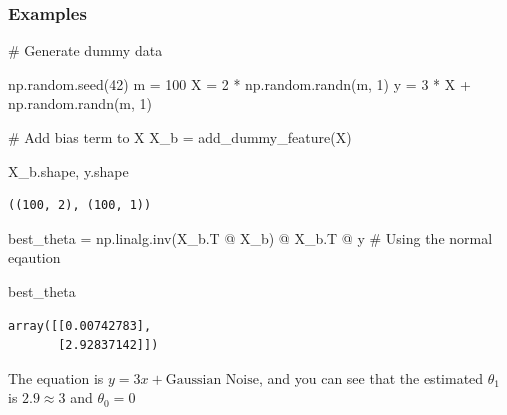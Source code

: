 \documentclass[
]{report}
\newenvironment{Shaded}{\begin{snugshade}}{\end{snugshade}}
\newcommand{\CommentTok}[1]{\textcolor[rgb]{0.37,0.37,0.37}{#1}}
\newcommand{\DecValTok}[1]{\textcolor[rgb]{0.68,0.00,0.00}{#1}}
\newcommand{\NormalTok}[1]{\textcolor[rgb]{0.00,0.23,0.31}{#1}}
\newcommand{\OperatorTok}[1]{\textcolor[rgb]{0.37,0.37,0.37}{#1}}
\begin{document}
\hypertarget{examples}{%
\subsubsection{Examples}\label{examples}}

\begin{Shaded}
\begin{Highlighting}[]
\CommentTok{\# Generate dummy data}

\NormalTok{np.random.seed(}\DecValTok{42}\NormalTok{)}
\NormalTok{m }\OperatorTok{=} \DecValTok{100}
\NormalTok{X }\OperatorTok{=} \DecValTok{2} \OperatorTok{*}\NormalTok{ np.random.randn(m, }\DecValTok{1}\NormalTok{)}
\NormalTok{y }\OperatorTok{=} \DecValTok{3} \OperatorTok{*}\NormalTok{ X }\OperatorTok{+}\NormalTok{ np.random.randn(m, }\DecValTok{1}\NormalTok{)}

\CommentTok{\# Add bias term to X}
\NormalTok{X\_b }\OperatorTok{=}\NormalTok{ add\_dummy\_feature(X)}
\end{Highlighting}
\end{Shaded}

\begin{Shaded}
\begin{Highlighting}[]
\NormalTok{X\_b.shape, y.shape}
\end{Highlighting}
\end{Shaded}

\begin{verbatim}
((100, 2), (100, 1))
\end{verbatim}

\begin{Shaded}
\begin{Highlighting}[]
\NormalTok{best\_theta }\OperatorTok{=}\NormalTok{ np.linalg.inv(X\_b.T }\OperatorTok{@}\NormalTok{ X\_b) }\OperatorTok{@}\NormalTok{ X\_b.T }\OperatorTok{@}\NormalTok{ y }\CommentTok{\# Using the normal eqaution}
\end{Highlighting}
\end{Shaded}

\begin{Shaded}
\begin{Highlighting}[]
\NormalTok{best\_theta}
\end{Highlighting}
\end{Shaded}

\begin{verbatim}
array([[0.00742783],
       [2.92837142]])
\end{verbatim}

The equation is \(y = 3x + \text{Gaussian Noise}\), and you can see that
the estimated \(\theta_{1}\) is \(2.9 \approx 3\) and \(\theta_{0} = 0\)
\end{document}

